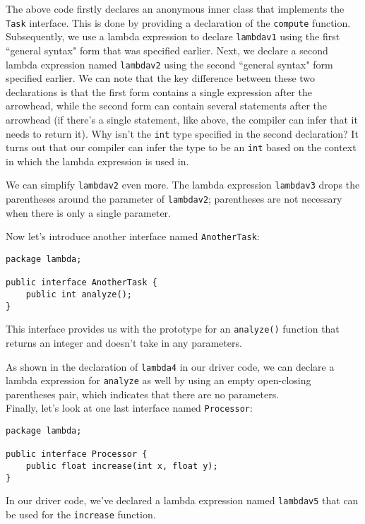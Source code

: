 The above code firstly declares an anonymous inner class that implements the \verb!Task! interface. This is done by providing a declaration of the \verb!compute! function. Subsequently, we use a lambda expression to declare \verb!lambdav1! using the first ``general syntax" form that was specified earlier. Next, we declare a second lambda expression named \verb!lambdav2! using the second ``general syntax" form specified earlier. We can note that the key difference between these two declarations is that the first form contains a single expression after the arrowhead, while the second form can contain several statements after the arrowhead (if there's a single statement, like above, the compiler can infer that it needs to return it). Why isn't the \verb!int! type specified in the second declaration? It turns out that our compiler can infer the type to be an \verb!int! based on the context in which the lambda expression is used in.

We can simplify \verb!lambdav2! even more. The lambda expression \verb!lambdav3! drops the parentheses around the parameter of \verb!lambdav2!; parentheses are not necessary when there is only a single parameter. 


Now let's introduce another interface named \verb!AnotherTask!:

\begin{lstlisting}
package lambda;

public interface AnotherTask {
	public int analyze();
}
\end{lstlisting}

This interface provides us with the prototype for an \verb!analyze()! function that returns an integer and doesn't take in any parameters. 

As shown in the declaration of \verb!lambda4! in our driver code, we can declare a lambda expression for \verb!analyze! as well by using an empty open-closing parentheses pair, which indicates that there are no parameters. \\

Finally, let's look at one last interface named \verb!Processor!:

\begin{lstlisting}
package lambda;

public interface Processor {
	public float increase(int x, float y);
}
\end{lstlisting}

In our driver code, we've declared a lambda expression named \verb!lambdav5! that can be used for the \verb!increase! function. 

